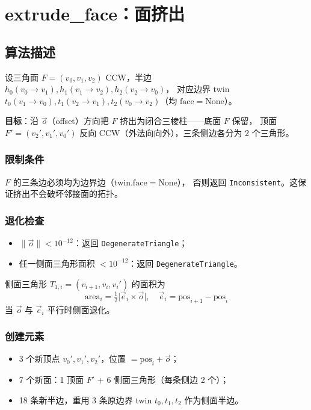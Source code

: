 \documentclass[11pt,a4paper]{article}
\begin{document}
\section{extrude\_face：面挤出}

\subsection{算法描述}

设三角面 $F = (v_0, v_1, v_2)$ CCW，半边 $h_0(v_0 \to v_1), h_1(v_1 \to v_2), h_2(v_2 \to v_0)$，
对应边界 twin $t_0(v_1 \to v_0), t_1(v_2 \to v_1), t_2(v_0 \to v_2)$（均 $\mathrm{face} = \mathrm{None}$）。

\textbf{目标}：沿 $\vec{o}$（offset）方向把 $F$ 挤出为闭合三棱柱——底面 $F$ 保留，
顶面 $F' = (v_2', v_1', v_0')$ 反向 CCW（外法向向外），三条侧边各分为 2 个三角形。

\subsubsection{限制条件}

$F$ 的三条边必须均为边界边（$\mathrm{twin}.\mathrm{face} = \mathrm{None}$），
否则返回 \texttt{Inconsistent}。这保证挤出不会破坏邻接面的拓扑。

\subsubsection{退化检查}

\begin{itemize}
  \item $\|\vec{o}\| < 10^{-12}$：返回 \texttt{DegenerateTriangle}；
  \item 任一侧面三角形面积 $< 10^{-12}$：返回 \texttt{DegenerateTriangle}。
\end{itemize}

侧面三角形 $T_{1,i} = (v_{i+1}, v_i, v_i')$ 的面积为
\[
  \mathrm{area}_i = \tfrac{1}{2} \bigl| \vec{e}_i \times \vec{o} \bigr|,
  \quad \vec{e}_i = \mathrm{pos}_{i+1} - \mathrm{pos}_i
\]
当 $\vec{o}$ 与 $\vec{e}_i$ 平行时侧面退化。

\subsubsection{创建元素}

\begin{itemize}
  \item 3 个新顶点 $v_0', v_1', v_2'$，位置 $= \mathrm{pos}_i + \vec{o}$；
  \item 7 个新面：1 顶面 $F'$ + 6 侧面三角形（每条侧边 2 个）；
  \item 18 条新半边，重用 3 条原边界 twin $t_0, t_1, t_2$ 作为侧面半边。
\end{itemize}
\end{document}
